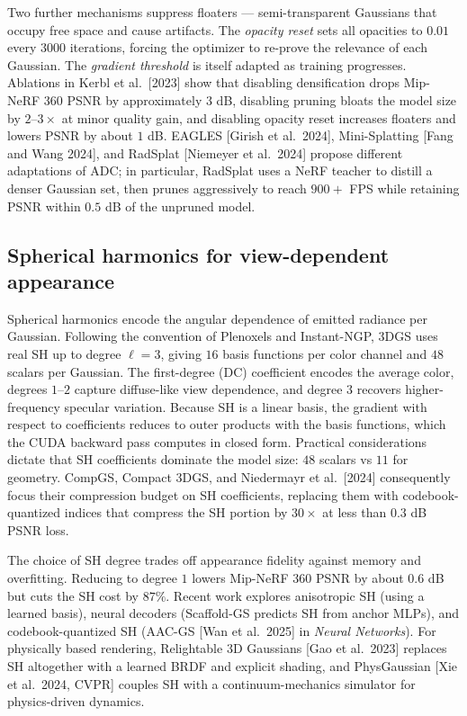 Two further mechanisms suppress floaters --- semi-transparent Gaussians that occupy free space and cause artifacts. The \emph{opacity reset} sets all opacities to \(0.01\) every \(3000\) iterations, forcing the optimizer to re-prove the relevance of each Gaussian. The \emph{gradient threshold} is itself adapted as training progresses. Ablations in Kerbl et al.~{[}2023{]} show that disabling densification drops Mip-NeRF 360 PSNR by approximately \(3\) dB, disabling pruning bloats the model size by \(2\)--\(3\times\) at minor quality gain, and disabling opacity reset increases floaters and lowers PSNR by about \(1\) dB. EAGLES {[}Girish et al.~2024{]}, Mini-Splatting {[}Fang and Wang 2024{]}, and RadSplat {[}Niemeyer et al.~2024{]} propose different adaptations of ADC; in particular, RadSplat uses a NeRF teacher to distill a denser Gaussian set, then prunes aggressively to reach \(900+\) FPS while retaining PSNR within \(0.5\) dB of the unpruned model.

\subsection{Spherical harmonics for view-dependent appearance}\label{spherical-harmonics-for-view-dependent-appearance}

Spherical harmonics encode the angular dependence of emitted radiance per Gaussian. Following the convention of Plenoxels and Instant-NGP, 3DGS uses real SH up to degree \(\ell=3\), giving \(16\) basis functions per color channel and \(48\) scalars per Gaussian. The first-degree (DC) coefficient encodes the average color, degrees \(1\)--\(2\) capture diffuse-like view dependence, and degree \(3\) recovers higher-frequency specular variation. Because SH is a linear basis, the gradient with respect to coefficients reduces to outer products with the basis functions, which the CUDA backward pass computes in closed form. Practical considerations dictate that SH coefficients dominate the model size: \(48\) scalars vs \(11\) for geometry. CompGS, Compact 3DGS, and Niedermayr et al.~{[}2024{]} consequently focus their compression budget on SH coefficients, replacing them with codebook-quantized indices that compress the SH portion by \(30\times\) at less than \(0.3\) dB PSNR loss.

The choice of SH degree trades off appearance fidelity against memory and overfitting. Reducing to degree \(1\) lowers Mip-NeRF 360 PSNR by about \(0.6\) dB but cuts the SH cost by \(87\%\). Recent work explores anisotropic SH (using a learned basis), neural decoders (Scaffold-GS predicts SH from anchor MLPs), and codebook-quantized SH (AAC-GS {[}Wan et al.~2025{]} in \emph{Neural Networks}). For physically based rendering, Relightable 3D Gaussians {[}Gao et al.~2023{]} replaces SH altogether with a learned BRDF and explicit shading, and PhysGaussian {[}Xie et al.~2024, CVPR{]} couples SH with a continuum-mechanics simulator for physics-driven dynamics.

